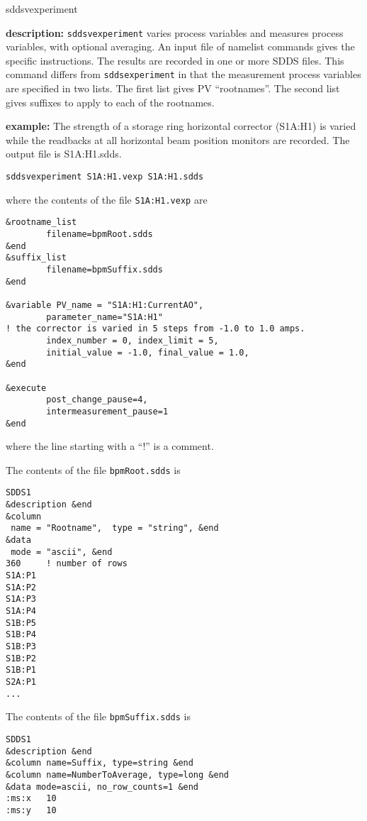 %
%
\begin{sddsprog}{sddsvexperiment}
\item {\bf description:}
%
%
\verb+sddsvexperiment+ varies process variables and measures process variables, with optional averaging.
An input file of namelist commands gives the specific instructions.
The results are recorded in one or more SDDS files. This command differs from
\verb+sddsexperiment+ in that the measurement process variables are specified in two lists.  The first
list gives PV ``rootnames''.  The second list gives suffixes to apply to each of 
the rootnames.
\item {\bf example:} 
%
% 
%
The strength of a storage ring horizontal corrector (S1A:H1) is varied while the readbacks at all horizontal beam position
monitors are recorded. The output file is S1A:H1.sdds.
\begin{verbatim}
sddsvexperiment S1A:H1.vexp S1A:H1.sdds
\end{verbatim}

where the contents of the file \verb+S1A:H1.vexp+ are
\begin{verbatim}
&rootname_list 
        filename=bpmRoot.sdds
&end
&suffix_list 
        filename=bpmSuffix.sdds
&end

&variable PV_name = "S1A:H1:CurrentAO",
        parameter_name="S1A:H1"
! the corrector is varied in 5 steps from -1.0 to 1.0 amps.
        index_number = 0, index_limit = 5,
        initial_value = -1.0, final_value = 1.0,
&end
        
&execute
        post_change_pause=4,
        intermeasurement_pause=1
&end
\end{verbatim}
where the line starting with a ``!'' is a comment.

The contents of the file \verb+bpmRoot.sdds+ is
\begin{verbatim}
SDDS1
&description &end
&column
 name = "Rootname",  type = "string", &end
&data
 mode = "ascii", &end
360     ! number of rows
S1A:P1
S1A:P2
S1A:P3
S1A:P4
S1B:P5
S1B:P4
S1B:P3
S1B:P2
S1B:P1
S2A:P1  
...
\end{verbatim}
The contents of the file \verb+bpmSuffix.sdds+ is
\begin{verbatim}
SDDS1
&description &end
&column name=Suffix, type=string &end
&column name=NumberToAverage, type=long &end
&data mode=ascii, no_row_counts=1 &end
:ms:x   10
:ms:y   10
\end{verbatim}


\end{sddsprog}

